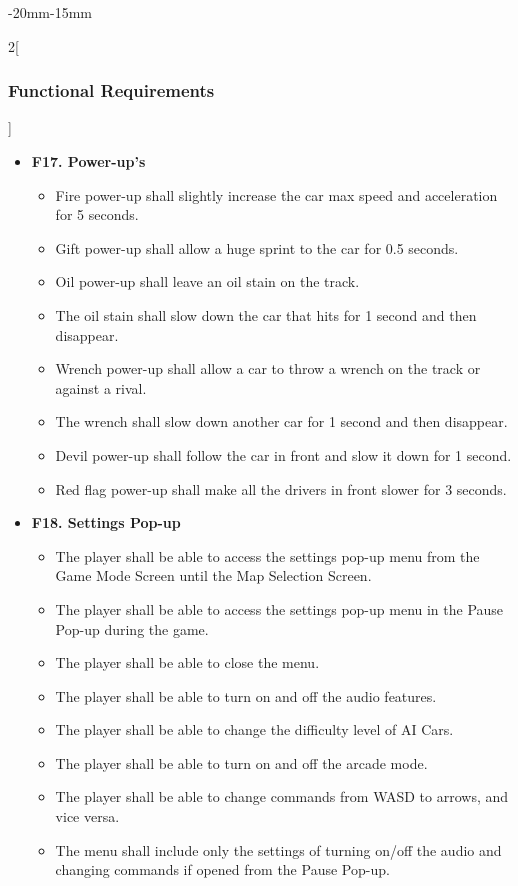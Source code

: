 \documentclass[12pt]{article}
\begin{document}
\begin{adjustwidth}{-20mm}{-15mm}
\begin{multicols}{2}[\subsubsection{Functional Requirements}]
\begin{itemize}[leftmargin=*]
\item \textbf{F17. Power-up's}
\begin{itemize}[leftmargin=*]
\item Fire power-up shall slightly increase the car max speed and acceleration for 5 seconds.
\item Gift power-up shall allow a huge sprint to the car for 0.5 seconds.
\item Oil power-up shall leave an oil stain on the track.
\item The oil stain shall slow down the car that hits for 1 second and then disappear.
\item Wrench power-up shall allow a car to throw a wrench on the track or against a rival.
\item The wrench shall slow down another car for 1 second and then disappear.
\item Devil power-up shall follow the car in front and slow it down for 1 second.
\item Red flag power-up shall make all the drivers in front slower for 3 seconds.
\end{itemize}

\item \textbf{F18. Settings Pop-up}
\begin{itemize}[leftmargin=*]
\item The player shall be able to access the settings pop-up menu from the Game Mode Screen until the Map Selection Screen.
\item The player shall be able to access the settings pop-up menu in the Pause Pop-up during the game.
\item The player shall be able to close the menu.
\item The player shall be able to turn on and off the audio features.
\item The player shall be able to change the difficulty level of AI Cars.
\item The player shall be able to turn on and off the arcade mode.
\item The player shall be able to change commands from WASD to arrows, and vice versa.
\item The menu shall include only the settings of turning on/off the audio and changing commands if opened from the Pause Pop-up.
\end{itemize}
\end{itemize}


\end{multicols}
\end{adjustwidth}
\end{document}
